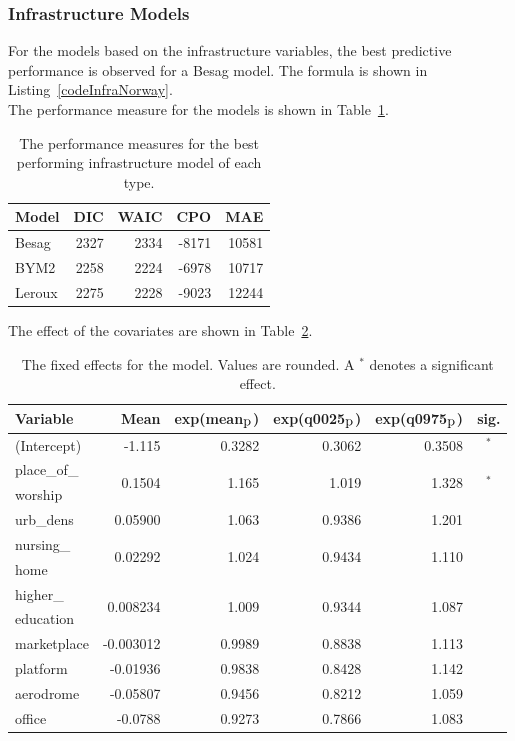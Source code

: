 \subsubsection{Infrastructure Models}
For the models based on the infrastructure variables, the best predictive performance is observed for a Besag model. The formula is shown in Listing~\ref{codeInfraNorway}. \\
The performance measure for the models is shown in Table~\ref{infraNorway}.
\begin{table}[H] 
\caption{The performance measures for the best performing infrastructure model of each type. \label{infraNorway}}
\begin{tabular}{l r r r r}
\toprule
\textbf{Model}	& \textbf{DIC}	& \textbf{WAIC} & \textbf{CPO} & \textbf{MAE} \\
\midrule
Besag  & 2327 & 2334 & -8171 & 10581 \\
BYM2 & 2258 & 2224 & -6978 & 10717\\
Leroux &  2275 & 2228 & -9023 & 12244\\
\bottomrule
\end{tabular}
\end{table}
The effect of the covariates are shown in Table~\ref{fixedInfraNorway_spatial}.
\begin{table}[H]
\caption{The fixed effects for the model. Values are rounded. A $^*$ denotes a significant effect. \label{fixedInfraNorway_spatial}}
\begin{tabular}{l r r r r c}
\toprule
\textbf{Variable}	& \textbf{Mean}	& \textbf{exp(mean$_{\hbox{p}}$)} & \textbf{exp(q0025$_{\hbox{p}}$)} & \textbf{exp(q0975$_{\hbox{p}}$)} & \textbf{sig.}\\
\midrule
(Intercept) & -1.115 & 0.3282 & 0.3062 & 0.3508 & $^*$ \\
place\_of\_ & \multirow{2}{*}{0.1504} & \multirow{2}{*}{1.165} & \multirow{2}{*}{1.019} & \multirow{2}{*}{1.328} & \multirow{2}{*}{$^*$} \\
worship\\
urb\_dens & 0.05900 & 1.063 & 0.9386 & 1.201 &  \\
nursing\_ & \multirow{2}{*}{0.02292} & \multirow{2}{*}{1.024} & \multirow{2}{*}{0.9434} & \multirow{2}{*}{1.110}\\
home\\
higher\_ & \multirow{2}{*}{0.008234} & \multirow{2}{*}{1.009} & \multirow{2}{*}{0.9344} & \multirow{2}{*}{1.087} \\
education\\
marketplace & -0.003012 & 0.9989 & 0.8838 & 1.113 \\
platform & -0.01936 & 0.9838 & 0.8428 & 1.142 \\
aerodrome & -0.05807 & 0.9456 & 0.8212 & 1.059  \\
office & -0.0788 & 0.9273 & 0.7866 & 1.083  \\
\bottomrule
\end{tabular}
\end{table}
